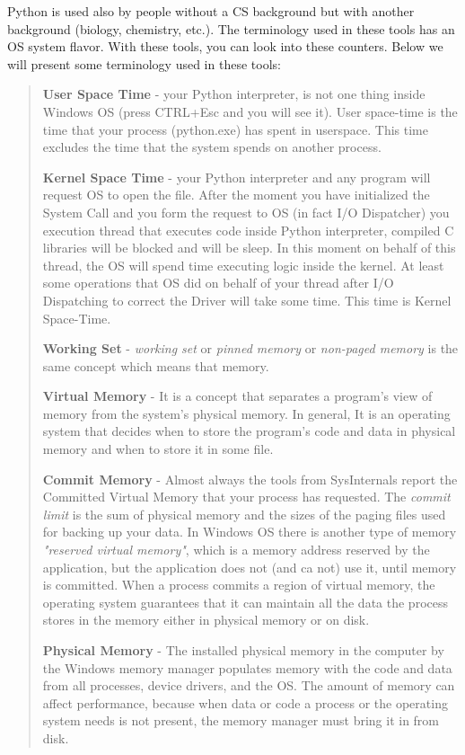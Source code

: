 \documentclass[
]{article}
\begin{document}
Python is used also by people without a CS background but with another
background (biology, chemistry, etc.). The terminology used in these
tools has an OS system flavor. With these tools, you can look into these
counters. Below we will present some terminology used in these tools:

\begin{quote}
\textbf{User Space Time} - your Python interpreter, is not one thing
inside Windows OS (press CTRL+Esc and you will see it). User space-time
is the time that your process (python.exe) has spent in userspace. This
time excludes the time that the system spends on another process.

\textbf{Kernel Space Time} - your Python interpreter and any program
will request OS to open the file. After the moment you have initialized
the System Call and you form the request to OS (in fact I/O Dispatcher)
you execution thread that executes code inside Python interpreter,
compiled C libraries will be blocked and will be sleep. In this moment
on behalf of this thread, the OS will spend time executing logic inside
the kernel. At least some operations that OS did on behalf of your
thread after I/O Dispatching to correct the Driver will take some time.
This time is Kernel Space-Time.

\textbf{Working Set} - \emph{working set} or \emph{pinned memory} or
\emph{non-paged memory} is the same concept which means that memory.

\textbf{Virtual Memory} - It is a concept that separates a program's
view of memory from the system's physical memory. In general, It is an
operating system that decides when to store the program's code and data
in physical memory and when to store it in some file.

\textbf{Commit Memory} - Almost always the tools from SysInternals
report the Committed Virtual Memory that your process has requested. The
\emph{commit limit} is the sum of physical memory and the sizes of the
paging files used for backing up your data. In Windows OS there is
another type of memory \emph{"reserved virtual memory"}, which is a
memory address reserved by the application, but the application does not
(and ca not) use it, until memory is committed. When a process commits a
region of virtual memory, the operating system guarantees that it can
maintain all the data the process stores in the memory either in
physical memory or on disk.

\textbf{Physical Memory} - The installed physical memory in the computer
by the Windows memory manager populates memory with the code and data
from all processes, device drivers, and the OS. The amount of memory can
affect performance, because when data or code a process or the operating
system needs is not present, the memory manager must bring it in from
disk.


\end{quote}
\end{document}
